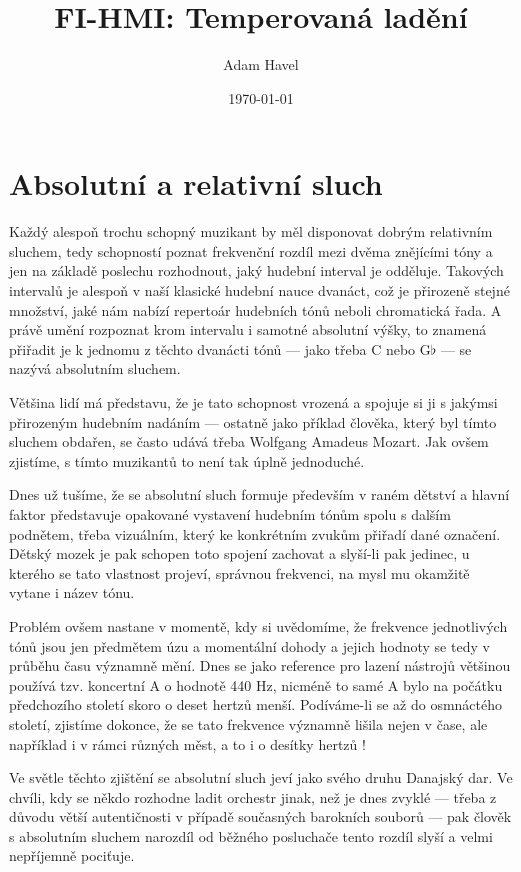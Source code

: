 \documentclass[12pt]{article}
\title{FI-HMI: Temperovaná ladění}
\date{\today}
\author{Adam Havel}
\begin{document}
\maketitle

\section{Absolutní a relativní sluch}

Každý alespoň trochu schopný muzikant by měl disponovat dobrým relativním sluchem, tedy schopností poznat frekvenční rozdíl mezi dvěma znějícími tóny a jen na základě poslechu rozhodnout, jaký hudební interval je odděluje. Takových intervalů je alespoň v naší klasické hudební nauce dvanáct, což je přirozeně stejné množství, jaké nám nabízí repertoár hudebních tónů neboli chromatická řada. A právě umění rozpoznat krom intervalu i samotné absolutní výšky, to znamená přiřadit je k jednomu z těchto dvanácti tónů — jako třeba C nebo G$\flat$ — se nazývá absolutním sluchem.

Většina lidí má představu, že je tato schopnost vrozená a spojuje si ji s jakýmsi přirozeným hudebním nadáním — ostatně jako příklad člověka, který byl tímto sluchem obdařen, se často udává třeba Wolfgang Amadeus Mozart. Jak ovšem zjistíme, s tímto  muzikantů to není tak úplně jednoduché.

Dnes už tušíme, že se absolutní sluch formuje především v raném dětství a hlavní faktor představuje opakované vystavení hudebním tónům spolu s dalším podnětem, třeba vizuálním, který ke konkrétním zvukům přiřadí dané označení. Dětský mozek je pak schopen toto spojení zachovat a slyší-li pak jedinec, u kterého se tato vlastnost projeví, správnou frekvenci, na mysl mu okamžitě vytane i název tónu.

Problém ovšem nastane v momentě, kdy si uvědomíme, že frekvence jednotlivých tónů jsou jen předmětem úzu a momentální dohody a jejich hodnoty se tedy v průběhu času významně mění. Dnes se jako reference pro lazení nástrojů většinou používá tzv. koncertní A o hodnotě 440 Hz, nicméně to samé A bylo na počátku předchozího století skoro o deset hertzů menší. Podíváme-li se až do osmnáctého století, zjistíme dokonce, že se tato frekvence významně lišila nejen v čase, ale například i v rámci různých měst, a to i o desítky hertzů \cite{wiki_pitch}!

Ve světle těchto zjištění se absolutní sluch jeví jako svého druhu Danajský dar. Ve chvíli, kdy se někdo rozhodne ladit orchestr jinak, než je dnes zvyklé — třeba z důvodu větší autentičnosti v případě současných barokních souborů — pak člověk s absolutním sluchem narozdíl od běžného posluchače tento rozdíl slyší a velmi nepříjemně pociťuje.
\end{document}

